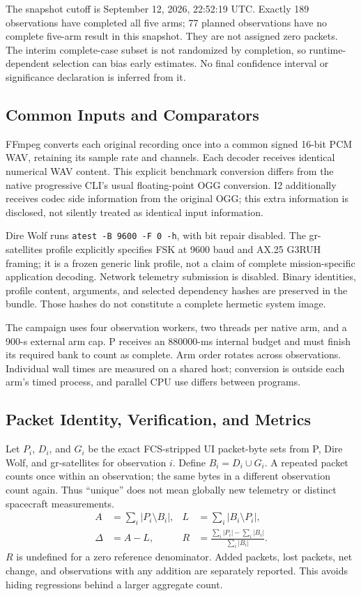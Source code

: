 \documentclass{ieeeaccess}
\begin{document}
The snapshot cutoff is September 12, 2026, 22:52:19 UTC. Exactly 189 observations have completed all five arms; 77 planned observations have no complete five-arm result in this snapshot. They are not assigned zero packets. The interim complete-case subset is not randomized by completion, so runtime-dependent selection can bias early estimates. No final confidence interval or significance declaration is inferred from it.

\subsection{Common Inputs and Comparators}
FFmpeg converts each original recording once into a common signed 16-bit PCM WAV, retaining its sample rate and channels. Each decoder receives identical numerical WAV content. This explicit benchmark conversion differs from the native progressive CLI's usual floating-point OGG conversion. I2 additionally receives codec side information from the original OGG; this extra information is disclosed, not silently treated as identical input information.

Dire Wolf runs \texttt{atest -B 9600 -F 0 -h}, with bit repair disabled. The gr-satellites profile explicitly specifies FSK at 9600 baud and AX.25 G3RUH framing; it is a frozen generic link profile, not a claim of complete mission-specific application decoding. Network telemetry submission is disabled. Binary identities, profile content, arguments, and selected dependency hashes are preserved in the bundle. Those hashes do not constitute a complete hermetic system image.

The campaign uses four observation workers, two threads per native arm, and a 900-s external arm cap. P receives an 880000-ms internal budget and must finish its required bank to count as complete. Arm order rotates across observations. Individual wall times are measured on a shared host; conversion is outside each arm's timed process, and parallel CPU use differs between programs.

\subsection{Packet Identity, Verification, and Metrics}
Let $P_i$, $D_i$, and $G_i$ be the exact FCS-stripped UI packet-byte sets from P, Dire Wolf, and gr-satellites for observation $i$. Define $B_i=D_i\cup G_i$. A repeated packet counts once within an observation; the same bytes in a different observation count again. Thus ``unique'' does not mean globally new telemetry or distinct spacecraft measurements.
\begin{align}
A&=\sum_i |P_i\setminus B_i|,&
L&=\sum_i |B_i\setminus P_i|,\\
\Delta&=A-L,&
R&=\frac{\sum_i |P_i|-\sum_i |B_i|}{\sum_i |B_i|}.
\label{eq:yield}
\end{align}
$R$ is undefined for a zero reference denominator. Added packets, lost packets, net change, and observations with any addition are separately reported. This avoids hiding regressions behind a larger aggregate count.
\end{document}
